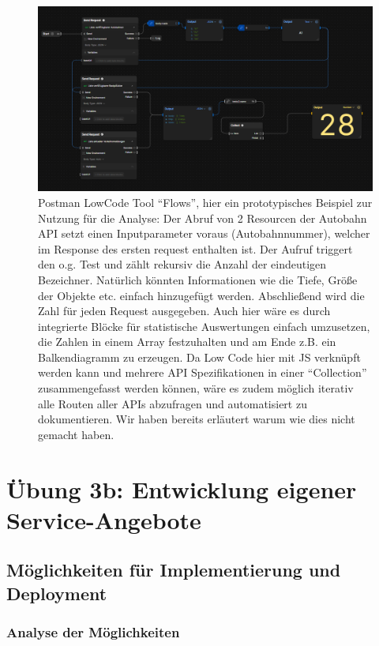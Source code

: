 \documentclass[notitlepage, hidelinks]{article}
\begin{document}
\begin{figure}[H]
\centering
  \includegraphics[width=\textwidth]{images/postmanflows.png}
  \caption{Postman LowCode Tool ``Flows'', hier ein prototypisches Beispiel zur Nutzung für die Analyse: Der Abruf von 2 Resourcen der Autobahn API setzt einen Inputparameter voraus (Autobahnnummer), welcher im Response des ersten request enthalten ist. Der Aufruf triggert den o.g. Test und zählt rekursiv die Anzahl der eindeutigen Bezeichner. Natürlich könnten Informationen wie die Tiefe, Größe der Objekte etc. einfach hinzugefügt werden. Abschließend wird die Zahl für jeden Request ausgegeben. Auch hier wäre es durch integrierte Blöcke für statistische Auswertungen einfach umzusetzen, die Zahlen in einem Array festzuhalten und am Ende z.B. ein Balkendiagramm zu erzeugen. Da Low Code hier mit JS verknüpft werden kann und mehrere API Spezifikationen in einer ``Collection'' zusammengefasst werden können, wäre es zudem möglich iterativ alle Routen aller APIs abzufragen und automatisiert zu dokumentieren. Wir haben bereits erläutert warum wie dies nicht gemacht haben.}
  \label{flows}
\end{figure}

\newpage
\section{Übung 3b: Entwicklung eigener Service-Angebote}
\subsection{Möglichkeiten für Implementierung und Deployment}
\subsubsection{Analyse der Möglichkeiten}
\end{document}
